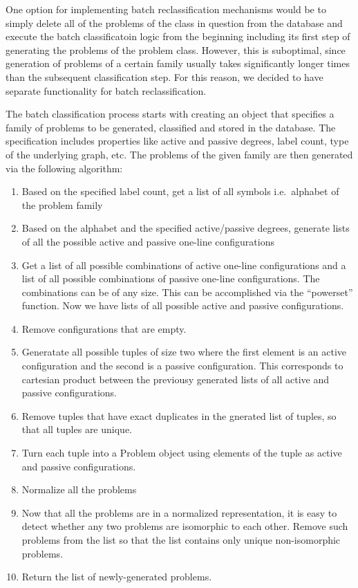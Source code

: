 One option for implementing batch reclassification
mechanisms would be to simply delete all of the problems
of the class in question from the database and execute
the batch classificatoin logic from the beginning
including its first step of generating the problems
of the problem class. However, this is suboptimal,
since generation of problems of a certain family
usually takes significantly longer times than
the subsequent classification step. For this reason,
we decided to have separate functionality for
batch reclassification.

The batch classification process starts with creating
an object that specifies a family of problems to be
generated, classified and stored in the database.
The specification includes properties like
active and passive degrees, label count, type of the
underlying graph, etc. The problems of the given
family are then generated via the following algorithm:

\begin{enumerate}
  \item Based on the specified label count, get a list of
  all symbols i.e.\ alphabet of the problem family
  \item Based on the alphabet and the specified active/passive
  degrees, generate lists of all the possible
  active and passive one-line configurations
  \item Get a list of all possible combinations
  of active one-line configurations and a list of all possible
  combinations of passive one-line configurations. The combinations
  can be of any size. This can be accomplished via
  the ``powerset'' function. Now we have lists of
  all possible active and passive configurations.
  \item Remove configurations that are empty.
  \item Generatate all possible tuples of size two
  where the first element is an active configuration and
  the second is a passive configuration. This corresponds
  to cartesian product between the previousy generated
  lists of all active and passive configurations.
  \item Remove tuples that have exact duplicates in the
  gnerated list of tuples, so that all tuples are unique.
  \item Turn each tuple into a Problem object using
  elements of the tuple as active and passive configurations.
  \item Normalize all the problems
  \item Now that all the problems are in a normalized 
  representation, it is easy to detect whether any two
  problems are isomorphic to each other. Remove such
  problems from the list so that the list contains only
  unique non-isomorphic problems.
  \item Return the list of newly-generated problems.
\end{enumerate}

